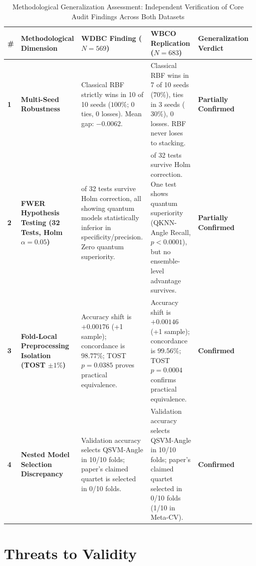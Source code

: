 \documentclass[journal,twocolumn]{IEEEtran}
\begin{document}
\begin{table}[!t]
\caption{Methodological Generalization Assessment: Independent Verification of Core Audit Findings Across Both Datasets}
\label{tab:generalization}
\centering
\footnotesize
\renewcommand{\arraystretch}{1.25}
\begin{tabularx}{\textwidth}{>{\centering\arraybackslash\bfseries}p{0.5cm} >{\raggedright\arraybackslash\bfseries}p{3.2cm} >{\raggedright\arraybackslash}p{3.8cm} >{\raggedright\arraybackslash}X >{\centering\arraybackslash\bfseries}p{2.3cm}}
\toprule
\# & Methodological Dimension & WDBC Finding ($N=569$) & WBCO Replication ($N=683$) & Generalization Verdict \\
\midrule
1 & Multi-Seed Robustness & Classical RBF strictly wins in 10 of 10 seeds ($100\%$; 0 ties, 0 losses). Mean gap: $-0.0062$. & Classical RBF wins in 7 of 10 seeds ($70\%$), ties in 3 seeds ($30\%$), 0 losses. RBF never loses to stacking. & \textbf{Partially Confirmed} \\
\midrule
2 & FWER Hypothesis Testing (32 Tests, Holm $\alpha = 0.05$) & 6 of 32 tests survive Holm correction, all showing quantum models statistically inferior in specificity/precision. Zero quantum superiority. & 3 of 32 tests survive Holm correction. One test shows quantum superiority (QKNN-Angle Recall, $p < 0.0001$), but no ensemble-level advantage survives. & \textbf{Partially Confirmed} \\
\midrule
3 & Fold-Local Preprocessing Isolation (TOST $\pm 1\%$) & Accuracy shift is $+0.00176$ (+1 sample); concordance is $98.77\%$; TOST $p = 0.0385$ proves practical equivalence. & Accuracy shift is $+0.00146$ (+1 sample); concordance is $99.56\%$; TOST $p = 0.0004$ confirms practical equivalence. & \textbf{Confirmed} \\
\midrule
4 & Nested Model Selection Discrepancy & Validation accuracy selects QSVM-Angle in 10/10 folds; paper's claimed quartet is selected in 0/10 folds. & Validation accuracy selects QSVM-Angle in 10/10 folds; paper's claimed quartet selected in 0/10 folds (1/10 in Meta-CV). & \textbf{Confirmed} \\
\bottomrule
\end{tabularx}
\end{table}

\section{Threats to Validity}
\label{sec:threats}
\end{document}
